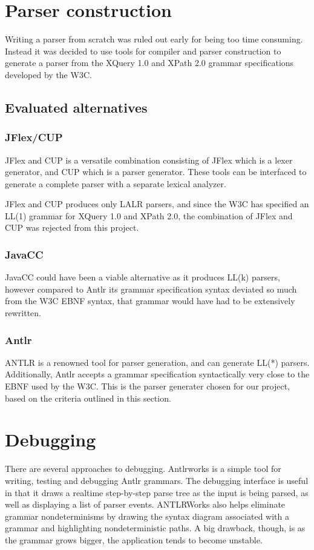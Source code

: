 \section{Parser construction}
Writing a parser from scratch was ruled out early for being too time consuming.
Instead it was decided to use tools for compiler and parser construction to
generate a parser from the XQuery 1.0 and XPath 2.0 grammar specifications
developed by the W3C.

\subsection{Evaluated alternatives}
\subsubsection{JFlex/CUP}
JFlex and CUP is a versatile combination consisting of JFlex which is a lexer
generator, and CUP which is a parser generator. These tools can be interfaced to
generate a complete parser with a separate lexical analyzer.

JFlex and CUP produces only LALR parsers, and since the W3C has specified an
LL(1) grammar for XQuery 1.0 and XPath 2.0, the combination of JFlex and CUP was
rejected from this project.

\subsubsection{JavaCC}
JavaCC could have been a viable alternative as it produces LL(k) parsers,
however compared to Antlr its grammar specification syntax deviated so much
from the W3C EBNF syntax, that grammar would have had to be extensively
rewritten.

\subsubsection{Antlr}
ANTLR is a renowned tool for parser generation, and can generate LL(*) parsers.
Additionally, Antlr accepts a grammar specification syntactically very close to
the EBNF used by the W3C. This is the parser generater chosen for our project,
based on the criteria outlined in this section.

\section{Debugging}
\label{sect:method:debugging}
There are several approaches to debugging. Antlrworks \cite{antlrwrks00} is a
simple tool for writing, testing and debugging Antlr grammars. The debugging
interface is useful in that it draws a realtime step-by-step parse tree as the
input is being parsed, as well as displaying a list of parser events. ANTLRWorks also helps eliminate grammar nondeterminisms by drawing the syntax diagram associated with a grammar and highlighting nondeterministic paths. A big drawback, though, is as the grammar grows bigger, the application tends to become unstable.

